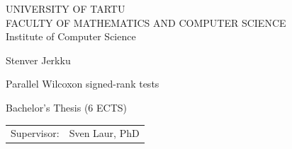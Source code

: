 \documentclass[12pt]{article}
\begin{document}
\thispagestyle{empty}
\begin{center}

\large
UNIVERSITY OF TARTU\\[2mm]
\uppercase{Faculty of Mathematics and Computer Science}\\[2mm]
Institute of Computer Science\\

\vspace{25mm}

\Large Stenver Jerkku

\vspace{4mm}

\huge Parallel Wilcoxon signed-rank tests

\vspace{20mm}

\Large Bachelor's Thesis (6 ECTS)

\end{center}

\vspace{2mm}

\begin{flushright}
 {
 \setlength{\extrarowheight}{5pt}
 \begin{tabular}{r l}
  \sffamily Supervisor: & \sffamily Sven Laur, PhD
 \end{tabular}
 }
\end{flushright}

\vspace{10mm}

\vspace{2mm}



\vspace{2mm}


\vspace{8mm}
\end{document}
